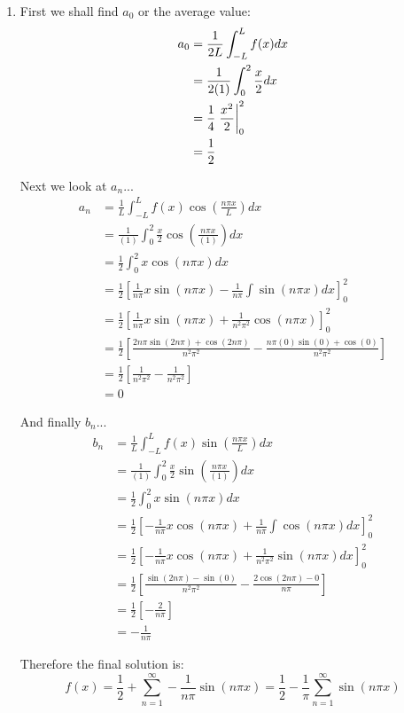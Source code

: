 \documentclass[11pt,letterpaper,twoside]{book}
\newenvironment{mathstuff}
   {\cbcolor{black}\par \vspace{8pt} \cbstart \vspace{-15pt} \begin{enumerate} \item[]}
   {\end{enumerate} \vspace{-5pt} \cbend \par \vspace{7pt} }
\begin{document}
\begin{mathstuff}
First we shall find $a_0$ or the average value:
\begin{align*}
a_0 &= \frac{1}{2L} \int_{-L}^L f(x) dx  \\
    &= \frac{1}{2(1)} \int_0^{2} \frac{x}{2} dx \\
    &= \frac{1}{4} \left. \frac{x^2}{2} \vphantom{\frac{1}{2}} \right|^2_0 \\
    &= \frac{1}{2}
\end{align*}

Next we look at $a_n$...
\begin{align*}
a_n &= \frac{1}{L}  \int_{-L}^L f(x) \cos \left( \frac{n\pi x}{L} \right) dx \\
    &= \frac{1}{(1)} \int_0^2 \frac{x}{2} \cos \left( \frac{n\pi x}{(1)} \right) dx \\
    &= \frac{1}{2} \int_0^2 x \cos \left( n\pi x \right) dx \\
    &= \frac{1}{2} \left[ \frac{1}{n\pi} x \sin \left( n\pi x \right) - \frac{1}{n\pi} \int \sin \left( n\pi x \right) dx \right]^2_0 \\
    &= \frac{1}{2} \left[ \frac{1}{n\pi} x \sin \left( n\pi x \right) + \frac{1}{n^2\pi^2} \cos \left( n\pi x \right) \right]^2_0 \\
    &= \frac{1}{2} \left[ \frac{2n\pi \sin \left( 2n\pi \right) + \cos \left( 2n\pi \right)}{n^2\pi^2} - \frac{n\pi (0) \sin \left(0 \right) + \cos \left( 0 \right)}{n^2\pi^2} \right] \\
    &= \frac{1}{2} \left[ \frac{1}{n^2\pi^2} - \frac{1}{n^2\pi^2} \right] \\
    &= 0
\end{align*}

And finally $b_n$...
\begin{align*}
b_n &= \frac{1}{L} \int_{-L}^L f(x) \sin \left( \frac{n\pi x}{L} \right) dx \\
    &= \frac{1}{(1)} \int_0^2 \frac{x}{2} \sin \left( \frac{n\pi x}{(1)} \right) dx \\
    &= \frac{1}{2} \int_0^2 x \sin \left( n\pi x \right) dx \\
    &= \frac{1}{2} \left[ - \frac{1}{n\pi} x \cos \left( n\pi x \right) + \frac{1}{n\pi} \int \cos \left( n\pi x \right) dx \right]^2_0 \\
    &= \frac{1}{2} \left[ - \frac{1}{n\pi} x \cos \left( n\pi x \right) + \frac{1}{n^2\pi^2} \sin \left( n\pi x \right) dx \right]^2_0 \\
    &= \frac{1}{2} \left[ \frac{\sin (2n\pi) - \sin(0)}{ n^2\pi^2 } - \frac{2\cos(2n\pi) - 0 }{n\pi} \right] \\
    &= \frac{1}{2} \left[ -\frac{2}{n\pi} \right] \\
    &= - \frac{1}{n\pi}
\end{align*}

Therefore the final solution is:
\[
f(x) = \frac{1}{2} + \sum_{n=1}^\infty -\frac{1}{n\pi} \sin (n\pi x) = \frac{1}{2} - \frac{1}{\pi} \sum_{n=1}^\infty \sin (n\pi x)
\]
\end{mathstuff}
\end{document}
